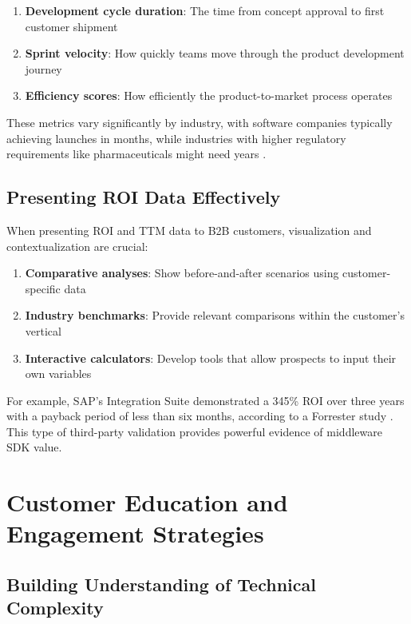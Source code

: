 \documentclass[11pt,a4paper]{article}
\begin{document}
\begin{enumerate}
    \item \textbf{Development cycle duration}: The time from concept approval to first customer shipment
    \item \textbf{Sprint velocity}: How quickly teams move through the product development journey
    \item \textbf{Efficiency scores}: How efficiently the product-to-market process operates
\end{enumerate}

These metrics vary significantly by industry, with software companies typically achieving launches in months, while industries with higher regulatory requirements like pharmaceuticals might need years \citep{kleshchuk2021timetomarket}.

\subsection{Presenting ROI Data Effectively}

When presenting ROI and TTM data to B2B customers, visualization and contextualization are crucial:

\begin{enumerate}
    \item \textbf{Comparative analyses}: Show before-and-after scenarios using customer-specific data
    \item \textbf{Industry benchmarks}: Provide relevant comparisons within the customer's vertical
    \item \textbf{Interactive calculators}: Develop tools that allow prospects to input their own variables
\end{enumerate}

For example, SAP's Integration Suite demonstrated a 345\% ROI over three years with a payback period of less than six months, according to a Forrester study \citep{Sandhu2024}. This type of third-party validation provides powerful evidence of middleware SDK value.

\section{Customer Education and Engagement Strategies}

\subsection{Building Understanding of Technical Complexity}
\end{document}
